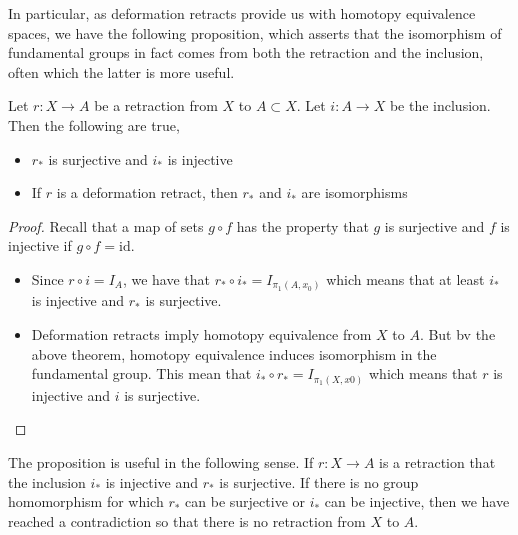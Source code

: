 \documentclass[a4paper]{article}
\begin{document}
In particular, as deformation retracts provide us with homotopy equivalence spaces, we have the following proposition, which asserts that the isomorphism of fundamental groups in fact comes from both the retraction and the inclusion, often which the latter is more useful. 

\begin{prp}{}{} Let $r:X\to A$ be a retraction from $X$ to $A\subset X$. Let $i:A\to X$ be the inclusion. Then the following are true, 
\begin{itemize}
\item $r_\ast$ is surjective and $i_\ast$ is injective
\item If $r$ is a deformation retract, then $r_\ast$ and $i_\ast$ are isomorphisms
\end{itemize} 
\begin{proof}
Recall that a map of sets $g\circ f$ has the property that $g$ is surjective and $f$ is injective if $g\circ f=\text{id}$. 
\begin{itemize}
\item Since $r\circ i=I_A$, we have that $r_\ast\circ i_\ast=I_{\pi_1(A,x_0)}$ which means that at least $i_\ast$ is injective and $r_\ast$ is surjective. 
\item Deformation retracts imply homotopy equivalence from $X$ to $A$. But bv the above theorem, homotopy equivalence induces isomorphism in the fundamental group. This mean that $i_\ast\circ r_\ast=I_{\pi_1(X,x0)}$ which means that $r$ is injective and $i$ is surjective. 
\end{itemize}
\end{proof}
\end{prp}

The proposition is useful in the following sense. If $r:X\to A$ is a retraction that the inclusion $i_\ast$ is injective and $r_\ast$ is surjective. If there is no group homomorphism for which $r_\ast$ can be surjective or $i_\ast$ can be injective, then we have reached a contradiction so that there is no retraction from $X$ to $A$.  
\end{document}
